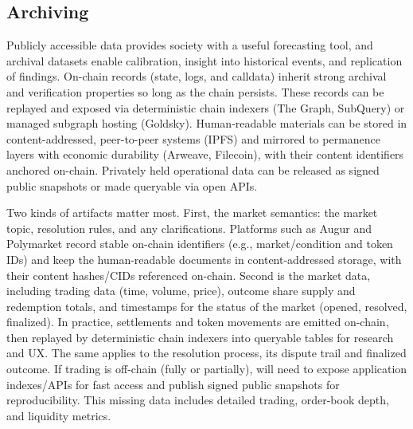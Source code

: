 


\subsection{Archiving}\label{wf:archive}

Publicly accessible \depm data provides society with a useful forecasting tool, and archival datasets enable calibration, insight into historical events, and replication of findings. On-chain records (state, logs, and calldata) inherit strong archival and verification properties so long as the chain persists. These records can be replayed and exposed via deterministic chain indexers (\eg The Graph, SubQuery) or managed subgraph hosting (\eg Goldsky). Human-readable materials can be stored in content-addressed, peer-to-peer systems (\eg IPFS) and mirrored to permanence layers with economic durability (\eg Arweave, Filecoin), with their content identifiers anchored on-chain. Privately held operational data can be released as signed public snapshots or made queryable via open APIs.

Two kinds of artifacts matter most. First, the market semantics: the market topic, resolution rules, and any clarifications. Platforms such as Augur and Polymarket record stable on-chain identifiers (e.g., market/condition and token IDs) and keep the human-readable documents in content-addressed storage, with their content hashes/CIDs referenced on-chain. Second is the market data, including trading data (time, volume, price), outcome share supply and redemption totals, and timestamps for the status of the market (\eg opened, resolved, finalized). In practice, settlements and token movements are emitted on-chain, then replayed by deterministic chain indexers into queryable tables for research and UX. The same applies to the resolution process, its dispute trail and finalized outcome. If trading is off-chain (fully or partially), \depms will need to expose application indexes/APIs for fast access and publish signed public snapshots for reproducibility. This missing data includes detailed trading, order-book depth, and liquidity metrics.

